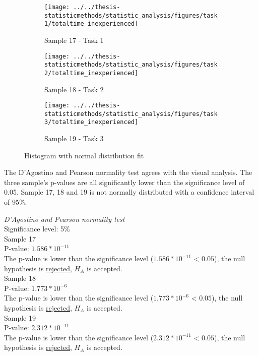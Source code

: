 \begin{figure}[H]
	\centering
	\begin{subfigure}[b]{0.32\textwidth}
		\centering
		\texttt{[image: ../../thesis-statisticmethods/statistic\_analysis/figures/task1/totaltime\_inexperienced]}
		\caption{Sample 17 - Task 1}
		\label{fig:totaltimeinexperienced_task1}
	\end{subfigure}
	\begin{subfigure}[b]{0.32\textwidth}
		\centering
		\texttt{[image: ../../thesis-statisticmethods/statistic\_analysis/figures/task2/totaltime\_inexperienced]}
		\caption{Sample 18 - Task 2}
		\label{fig:totaltimeinexperienced_task2}
	\end{subfigure}
	\begin{subfigure}[b]{0.32\textwidth}
		\centering
		\texttt{[image: ../../thesis-statisticmethods/statistic\_analysis/figures/task3/totaltime\_inexperienced]}
		\caption{Sample 19 - Task 3}
		\label{fig:totaltimeinexperienced_task3}
	\end{subfigure}
	\caption{Histogram with normal distribution fit}
\end{figure}

The D'Agostino and Pearson normality test agrees with the visual analysis. The three sample's p-values are all significantly lower than the significance level of 0.05. Sample 17, 18 and 19 is not normally distributed with a confidence interval of 95\%. \\[0.2cm]

  \begin{center}
	\begin{tcolorbox}[width=0.80\textwidth]
		\centering
		\textit{D'Agostino and Pearson normality test}\\
		Significance level: 5\%  \\[0.5cm]
		
		Sample 17 \\
		P-value: $1.586 * 10^{-11}$\\
		The p-value is lower than the significance level ($1.586 * 10^{-11}$ < $0.05$), the null hypothesis is \underline{rejected}, $H_{A}$ is accepted.\\[0.5cm]
		
		Sample 18 \\
		P-value: $1.773 * 10^{-6}$ \\
		The p-value is lower than the significance level ($1.773 * 10^{-6}$ < $0.05$), the null hypothesis is \underline{rejected}, $H_{A}$ is accepted.\\[0.5cm]
		
		Sample 19 \\
		P-value: $2.312 * 10 ^{-11}$ \\
		The p-value is lower than the significance level ($2.312 * 10 ^{-11}$ < $0.05$), the null hypothesis is \underline{rejected}, $H_{A}$ is accepted.\\[0.5cm]
	\end{tcolorbox}
\end{center}
\vspace{0.3cm}

